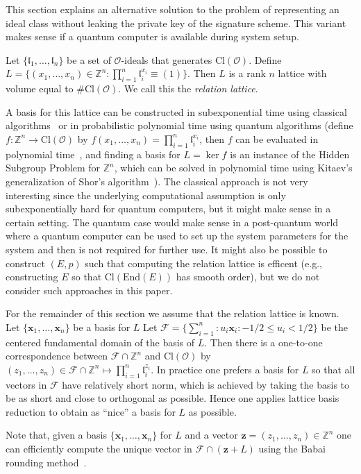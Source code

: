 \documentclass{llncs}
\newcommand{\FF}{\mathcal{F}}
\newcommand{\OO}{\mathcal{O}}
\newcommand{\Z}{\mathbb{Z}}
\newcommand{\End}{\text{End}}
\newcommand{\Cl}{\text{Cl}}
\renewcommand{\l}{\mathfrak{l}}
\newcommand{\x}{\textbf{x}}
\newcommand{\z}{\textbf{z}}
\begin{document}
This section explains an alternative solution to the problem of representing an ideal class without leaking the private key of the signature scheme.
This variant makes sense if a quantum computer is available during system setup.


Let $\{ \l_1, \dots, \l_n \}$ be a set of $\OO$-ideals that generates $\Cl( \OO )$.
Define $L = \{ (x_1, \dots, x_n ) \in \Z^n : \prod_{i=1}^n \l_i^{x_i} \equiv (1) \}$.
Then $L$ is a rank $n$ lattice with volume equal to $\#\Cl(\OO)$.
We call this the \emph{relation lattice}.

A basis for this lattice can be constructed in subexponential time using classical algorithms~\cite{hafner1989rigorous,biasse_fieker_jacobson_2016} or in probabilistic polynomial time using quantum algorithms (define $f:\Z^n\to\Cl(\OO)$ by $f(x_1,\dots,x_n)=\prod_{i=1}^n\l_i^{x_i}$, then $f$ can be evaluated in polynomial time~\cite{shanks1989gauss,Cohen1993}, and finding a basis for $L=\ker f$ is an instance of the Hidden Subgroup Problem for $\Z^n$, which can be solved in polynomial time using Kitaev's generalization of Shor's algorithm~\cite{kitaev1995hsp}).
The classical approach is not very interesting since the underlying computational assumption is only subexponentially hard for quantum computers, but it might make sense in a certain setting.
The quantum case would make sense in a post-quantum world where a quantum computer can be used to set up the system parameters for the system and then is not required for further use.
It might also be possible to construct $(E, p )$ such that computing the relation lattice is efficent (e.g., constructing $E$ so that $\Cl( \End(E))$ has smooth order), but we do not consider such approaches in this paper.

For the remainder of this section we assume that the relation lattice is known.
Let $\{ \x_1, \dots, \x_n \}$ be a basis for $L$
Let $\FF = \{ \sum_{i=1}^n : u_i \x_i : -1/2 \le u_i < 1/2 \}$ be the centered fundamental domain of the basis of $L$.
Then there is a one-to-one correspondence between $\FF \cap \Z^n$ and $\Cl(\OO)$ by
$(z_1, \dots, z_n ) \in \FF \cap \Z^n  \mapsto \prod_{i=1}^n \l_i^{z_i}$.
In practice one prefers a basis for $L$ so that all vectors in $\FF$ have relatively short norm, which is achieved by taking the basis to be as short and close to orthogonal as possible. Hence one applies lattice basis reduction to obtain as ``nice'' a basis for $L$ as possible.

Note that, given a basis $\{ \x_1, \dots, \x_n \}$ for $L$ and a vector $\z = (z_1, \dots, z_n ) \in \Z^n$ one can efficiently compute the unique vector in $\FF \cap (\z + L )$ using the Babai rounding method~\cite{Bab86}.
\end{document}
